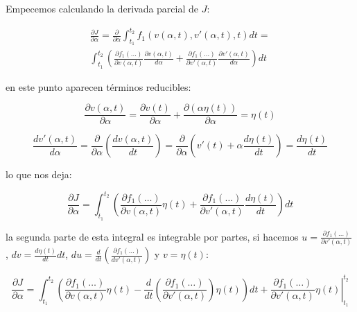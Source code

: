             Empecemos calculando la derivada parcial de $J$:

            \begin{multline*}
                \frac{\partial J}{\partial \alpha} = \frac{\partial}{\partial \alpha} \int_{t_1}^{t_2} f_1(v(\alpha, t), v'(\alpha, t), t)dt = \\
                \int_{t_1}^{t_2}\left( \frac{\partial f_1(\dots)}{\partial v(\alpha, t)} \frac{\partial v(\alpha, t)}{d \alpha} + \frac{\partial f_1(\dots)}{\partial v'(\alpha, t)} \frac{\partial v'(\alpha, t)}{d \alpha} \right) dt
            \end{multline*}

            en este punto aparecen términos reducibles:

            \begin{equation*}
                \frac{\partial v(\alpha, t)}{\partial \alpha} = \frac{\partial v(t)}{\partial \alpha} + \frac{\partial \left(\alpha \eta(t) \right)}{\partial \alpha} = \eta(t)
            \end{equation*}

            \begin{equation*}
                \frac{d v'(\alpha, t)}{d\alpha} = \frac{\partial}{\partial \alpha} \left( \frac{d v(\alpha, t)}{dt} \right) = \frac{\partial}{\partial \alpha} \left( v'(t) + \alpha \frac{d \eta(t)}{dt} \right) = \frac{d \eta(t)}{dt}
            \end{equation*}

            lo que nos deja:

            \begin{equation*}
                \frac{\partial J}{\partial \alpha} = \int_{t_1}^{t_2}\left( \frac{\partial f_1(\dots)}{\partial v(\alpha, t)} \eta(t) + \frac{\partial f_1(\dots)}{\partial v'(\alpha, t)} \frac{d \eta(t)}{dt} \right) dt
            \end{equation*}

            la segunda parte de esta integral es integrable por partes, si hacemos $u = \frac{\partial f_1(\dots)}{\partial v'(\alpha, t)}$, $dv = \frac{d\eta(t)}{dt}dt$, $du = \frac{d}{dt}\left( \frac{\partial f_1(\dots)}{dv'(\alpha, t)} \right)$ y $v = \eta(t)$:

            \begin{equation*}\frac{\partial J}{\partial \alpha} = \int_{t_1}^{t_2}\left( \frac{\partial f_1(\dots)}{\partial v(\alpha, t)} \eta(t) - \frac{d}{dt} \left( \frac{\partial f_1(\dots)}{\partial v'(\alpha, t)} \right) \eta(t) \right) dt + \left. \frac{\partial f_1(\dots)}{\partial v'(\alpha, t)} \eta(t) \right|_{t_1}^{t_2}
            \end{equation*}

